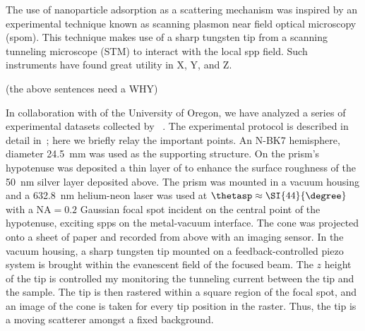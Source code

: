 The use of nanoparticle adsorption as a scattering mechanism was inspired
by an experimental technique known as scanning plasmon near field optical
microscopy (\gls{spom}).  This technique makes use of a sharp tungsten tip from a
scanning tunneling microscope (STM) to interact with the local \gls{spp} field.
Such instruments have found great utility in X, Y, and Z.

(the above sentences need a WHY)

In collaboration with  of the University of Oregon, we have
analyzed a series of experimental datasets collected by
~\cite{schumann2009surface}.  The experimental protocol is
described in detail in~\cite{schumann2009surface}; here we briefly relay
the important points.  An N-BK7 hemisphere, diameter
\SI{24.5}{\milli\meter} was used as the supporting structure.  On the
prism's hypotenuse was deposited a thin layer of  to enhance the
surface roughness of the \SI{50}{\nano\meter} silver layer deposited above.
The prism was mounted in a vacuum housing and a \SI{632.8}{\nano\meter}
helium-neon laser was used at $\thetasp\approx\SI{44}{\degree}$ with a
$\mathrm{NA}=0.2$ Gaussian focal spot incident on the central point of the
hypotenuse, exciting \glspl{spp} on the metal-vacuum interface.  The cone was
projected onto a sheet of paper and recorded from above with an imaging
sensor.  In the vacuum housing, a sharp tungsten tip mounted on a
feedback-controlled piezo system is brought within the evanescent field of
the focused beam.  The $z$ height of the tip is controlled my monitoring
the tunneling current between the tip and the sample.  The tip is then
rastered within a square region of the focal spot, and an image of the cone
is taken for every tip position in the raster.  Thus, the tip is a moving
scatterer amongst a fixed background.

